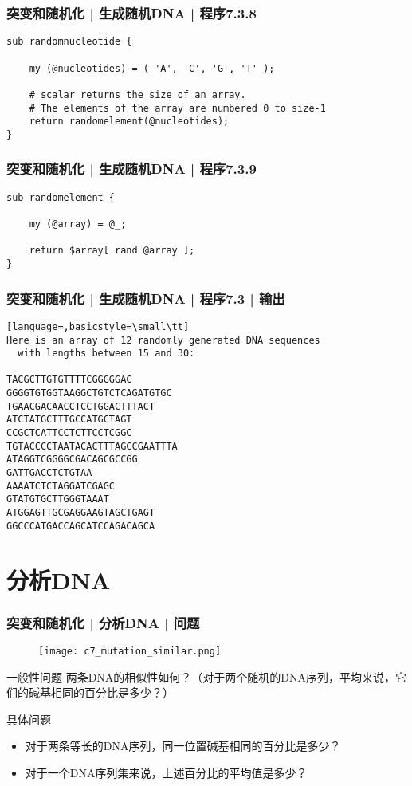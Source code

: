 \begin{frame}[fragile]
  \frametitle{突变和随机化 | 生成随机DNA | 程序7.3.8}
\begin{lstlisting}[firstnumber=140]
sub randomnucleotide {

    my (@nucleotides) = ( 'A', 'C', 'G', 'T' );

    # scalar returns the size of an array.
    # The elements of the array are numbered 0 to size-1
    return randomelement(@nucleotides);
}
\end{lstlisting}
\end{frame}


\begin{frame}[fragile]
  \frametitle{突变和随机化 | 生成随机DNA | 程序7.3.9}
\begin{lstlisting}[firstnumber=156]
sub randomelement {

    my (@array) = @_;

    return $array[ rand @array ];
}
\end{lstlisting}
\end{frame}


\begin{frame}[fragile]
  \frametitle{突变和随机化 | 生成随机DNA | 程序7.3 | 输出}
\begin{lstlisting}[language=,basicstyle=\small\tt]
Here is an array of 12 randomly generated DNA sequences
  with lengths between 15 and 30:

TACGCTTGTGTTTTCGGGGGAC
GGGGTGTGGTAAGGCTGTCTCAGATGTGC
TGAACGACAACCTCCTGGACTTTACT
ATCTATGCTTTGCCATGCTAGT
CCGCTCATTCCTCTTCCTCGGC
TGTACCCCTAATACACTTTAGCCGAATTTA
ATAGGTCGGGGCGACAGCGCCGG
GATTGACCTCTGTAA
AAAATCTCTAGGATCGAGC
GTATGTGCTTGGGTAAAT
ATGGAGTTGCGAGGAAGTAGCTGAGT
GGCCCATGACCAGCATCCAGACAGCA
\end{lstlisting}
\end{frame}

\section{分析DNA}
\begin{frame}
  \frametitle{突变和随机化 | 分析DNA | 问题}
  \begin{figure}
    \centering
    \texttt{[image: c7\_mutation\_similar.png]}
  \end{figure}
  \begin{block}{一般性问题}
    两条DNA的相似性如何？（对于两个随机的DNA序列，平均来说，它们的碱基相同的百分比是多少？）
  \end{block}
  \pause
  \begin{block}{具体问题}
    \begin{itemize}
      \item 对于两条等长的DNA序列，同一位置碱基相同的百分比是多少？
      \item 对于一个DNA序列集来说，上述百分比的平均值是多少？
    \end{itemize}
  \end{block}
\end{frame}

